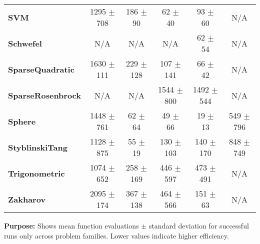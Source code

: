 \documentclass{article}
\begin{document}
\begin{table}[htbp]
{\begin{tabular}{lccccc}
\textbf{SVM} & 1295 $\pm$ 708 & 186 $\pm$ 90 & 62 $\pm$ 40 & 93 $\pm$ 60 & N/A \\
\textbf{Schwefel} & N/A & N/A & N/A & 62 $\pm$ 54 & N/A \\
\textbf{SparseQuadratic} & 1630 $\pm$ 111 & 229 $\pm$ 128 & 107 $\pm$ 141 & 66 $\pm$ 42 & N/A \\
\textbf{SparseRosenbrock} & N/A & N/A & 1544 $\pm$ 800 & 1492 $\pm$ 544 & N/A \\
\textbf{Sphere} & 1448 $\pm$ 761 & 62 $\pm$ 64 & 49 $\pm$ 66 & 19 $\pm$ 13 & 549 $\pm$ 796 \\
\textbf{StyblinskiTang} & 1128 $\pm$ 875 & 55 $\pm$ 19 & 130 $\pm$ 103 & 140 $\pm$ 170 & 848 $\pm$ 749 \\
\textbf{Trigonometric} & 1074 $\pm$ 652 & 258 $\pm$ 169 & 446 $\pm$ 597 & 473 $\pm$ 491 & N/A \\
\textbf{Zakharov} & 2095 $\pm$ 174 & 367 $\pm$ 138 & 464 $\pm$ 566 & 151 $\pm$ 63 & N/A \\
\bottomrule
\end{tabular}
}
\end{table}
\textbf{Purpose:} Shows mean function evaluations $\pm$ standard deviation for successful runs only across problem families. Lower values indicate higher efficiency.
\end{document}
